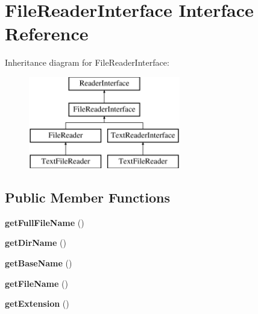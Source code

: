 \hypertarget{interface_pes_1_1_readers_1_1_file_reader_interface}{}\section{File\+Reader\+Interface Interface Reference}
\label{interface_pes_1_1_readers_1_1_file_reader_interface}
Inheritance diagram for File\+Reader\+Interface\+:\begin{figure}[H]
\begin{center}
\leavevmode
\includegraphics[height=4.000000cm]{interface_pes_1_1_readers_1_1_file_reader_interface}
\end{center}
\end{figure}
\subsection*{Public Member Functions}
\begin{DoxyCompactItemize}
\item 
\mbox{\label{interface_pes_1_1_readers_1_1_file_reader_interface_a5a9218f1e1a3edae01ec12081b801a30}} 
{\bfseries get\+Full\+File\+Name} ()
\item 
\mbox{\label{interface_pes_1_1_readers_1_1_file_reader_interface_ad72ee41de5e475eeef1b10a8a5d47b85}} 
{\bfseries get\+Dir\+Name} ()
\item 
\mbox{\label{interface_pes_1_1_readers_1_1_file_reader_interface_ab358af70bc7b8a585d0d3c9962468281}} 
{\bfseries get\+Base\+Name} ()
\item 
\mbox{\label{interface_pes_1_1_readers_1_1_file_reader_interface_afdeebfe3fcf5806fc79c074a6a3a6eb1}} 
{\bfseries get\+File\+Name} ()
\item 
\mbox{\label{interface_pes_1_1_readers_1_1_file_reader_interface_ae6914d3a98b1490a7da85ffb5e4cb8ab}} 
{\bfseries get\+Extension} ()
\end{DoxyCompactItemize}


